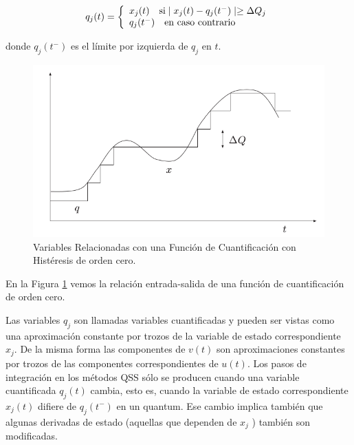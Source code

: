 	\begin{equation}
	q_j(t) = \left\{ 
	  \begin{array}{l l}
	    x_j(t)  \quad \text{si} \mid x_j (t ) - q_j (t^{-} ) \mid \geq \Delta Q_j \\
	    q_j (t^{-} ) \quad \text{en caso contrario}
	  \end{array} \right.
	\end{equation}
	
	donde $q_j (t^{-})$ es el límite por izquierda de $q_j$ en $t$.
	
	\begin{figure}[H]
	  \includegraphics[scale=0.5]{histeresis1}
	  \caption{Variables Relacionadas con una Función de Cuantificación con Histéresis de orden cero.}\label{fig:fig2-2}
	\end{figure}
	
	En la Figura \ref{fig:fig2-2} vemos la relación entrada-salida de una función de cuantificación de orden cero.
	
	Las variables $q_j$ son llamadas variables cuantificadas y pueden ser vistas como una aproximación constante por trozos de la variable de estado 
	correspondiente $x_j$. De la misma forma las componentes de $v(t)$ son aproximaciones constantes por trozos de las componentes correspondientes de $u(t)$. 
	Los pasos de integración en los métodos QSS sólo se producen cuando una variable cuantificada $q_j (t)$ cambia, esto es, cuando la variable de 
	estado correspondiente $x_j (t)$ difiere de $q_j(t^{-})$ en un quantum. Ese cambio implica también que algunas derivadas de estado (aquellas que 
	dependen de $x_j$ ) también son modificadas. 

